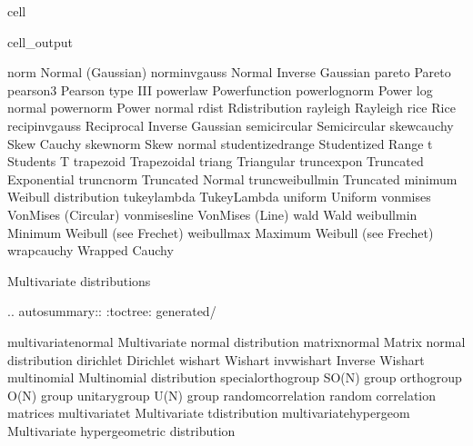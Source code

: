 \documentclass[letterpaper,10pt,english]{jupyterBook}
\begin{document}
\begin{sphinxuseclass}{cell}
\begin{sphinxVerbatimOutput}
\begin{sphinxuseclass}{cell_output}
\begin{sphinxVerbatim}[commandchars=\\\{\}]
   norm              \PYGZhy{}\PYGZhy{} Normal (Gaussian)
   norminvgauss      \PYGZhy{}\PYGZhy{} Normal Inverse Gaussian
   pareto            \PYGZhy{}\PYGZhy{} Pareto
   pearson3          \PYGZhy{}\PYGZhy{} Pearson type III
   powerlaw          \PYGZhy{}\PYGZhy{} Power\PYGZhy{}function
   powerlognorm      \PYGZhy{}\PYGZhy{} Power log normal
   powernorm         \PYGZhy{}\PYGZhy{} Power normal
   rdist             \PYGZhy{}\PYGZhy{} R\PYGZhy{}distribution
   rayleigh          \PYGZhy{}\PYGZhy{} Rayleigh
   rice              \PYGZhy{}\PYGZhy{} Rice
   recipinvgauss     \PYGZhy{}\PYGZhy{} Reciprocal Inverse Gaussian
   semicircular      \PYGZhy{}\PYGZhy{} Semicircular
   skewcauchy        \PYGZhy{}\PYGZhy{} Skew Cauchy
   skewnorm          \PYGZhy{}\PYGZhy{} Skew normal
   studentized\PYGZus{}range    \PYGZhy{}\PYGZhy{} Studentized Range
   t                 \PYGZhy{}\PYGZhy{} Student\PYGZsq{}s T
   trapezoid         \PYGZhy{}\PYGZhy{} Trapezoidal
   triang            \PYGZhy{}\PYGZhy{} Triangular
   truncexpon        \PYGZhy{}\PYGZhy{} Truncated Exponential
   truncnorm         \PYGZhy{}\PYGZhy{} Truncated Normal
   truncweibull\PYGZus{}min  \PYGZhy{}\PYGZhy{} Truncated minimum Weibull distribution
   tukeylambda       \PYGZhy{}\PYGZhy{} Tukey\PYGZhy{}Lambda
   uniform           \PYGZhy{}\PYGZhy{} Uniform
   vonmises          \PYGZhy{}\PYGZhy{} Von\PYGZhy{}Mises (Circular)
   vonmises\PYGZus{}line     \PYGZhy{}\PYGZhy{} Von\PYGZhy{}Mises (Line)
   wald              \PYGZhy{}\PYGZhy{} Wald
   weibull\PYGZus{}min       \PYGZhy{}\PYGZhy{} Minimum Weibull (see Frechet)
   weibull\PYGZus{}max       \PYGZhy{}\PYGZhy{} Maximum Weibull (see Frechet)
   wrapcauchy        \PYGZhy{}\PYGZhy{} Wrapped Cauchy

Multivariate distributions
\PYGZhy{}\PYGZhy{}\PYGZhy{}\PYGZhy{}\PYGZhy{}\PYGZhy{}\PYGZhy{}\PYGZhy{}\PYGZhy{}\PYGZhy{}\PYGZhy{}\PYGZhy{}\PYGZhy{}\PYGZhy{}\PYGZhy{}\PYGZhy{}\PYGZhy{}\PYGZhy{}\PYGZhy{}\PYGZhy{}\PYGZhy{}\PYGZhy{}\PYGZhy{}\PYGZhy{}\PYGZhy{}\PYGZhy{}

.. autosummary::
   :toctree: generated/

   multivariate\PYGZus{}normal    \PYGZhy{}\PYGZhy{} Multivariate normal distribution
   matrix\PYGZus{}normal          \PYGZhy{}\PYGZhy{} Matrix normal distribution
   dirichlet              \PYGZhy{}\PYGZhy{} Dirichlet
   wishart                \PYGZhy{}\PYGZhy{} Wishart
   invwishart             \PYGZhy{}\PYGZhy{} Inverse Wishart
   multinomial            \PYGZhy{}\PYGZhy{} Multinomial distribution
   special\PYGZus{}ortho\PYGZus{}group    \PYGZhy{}\PYGZhy{} SO(N) group
   ortho\PYGZus{}group            \PYGZhy{}\PYGZhy{} O(N) group
   unitary\PYGZus{}group          \PYGZhy{}\PYGZhy{} U(N) group
   random\PYGZus{}correlation     \PYGZhy{}\PYGZhy{} random correlation matrices
   multivariate\PYGZus{}t         \PYGZhy{}\PYGZhy{} Multivariate t\PYGZhy{}distribution
   multivariate\PYGZus{}hypergeom \PYGZhy{}\PYGZhy{} Multivariate hypergeometric distribution


\end{sphinxVerbatim}
\end{sphinxuseclass}
\end{sphinxVerbatimOutput}
\end{sphinxuseclass}
\end{document}

